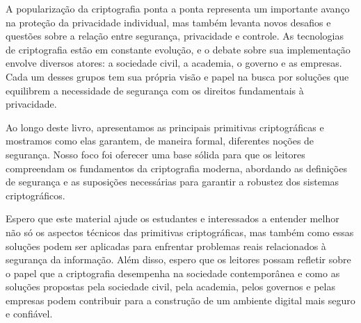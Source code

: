 A popularização da criptografia ponta a ponta representa um importante avanço na proteção da privacidade individual, mas também levanta novos desafios e questões sobre a relação entre segurança, privacidade e controle.
As tecnologias de criptografia estão em constante evolução, e o debate sobre sua implementação envolve diversos atores: a sociedade civil, a academia, o governo e as empresas.
Cada um desses grupos tem sua própria visão e papel na busca por soluções que equilibrem a necessidade de segurança com os direitos fundamentais à privacidade.

Ao longo deste livro, apresentamos as principais primitivas criptográficas e mostramos como elas garantem, de maneira formal, diferentes noções de segurança.
Nosso foco foi oferecer uma base sólida para que os leitores compreendam os fundamentos da criptografia moderna, abordando as definições de segurança e as suposições necessárias para garantir a robustez dos sistemas criptográficos.

Espero que este material ajude os estudantes e interessados a entender melhor não só os aspectos técnicos das primitivas criptográficas, mas também como essas soluções podem ser aplicadas para enfrentar problemas reais relacionados à segurança da informação.
Além disso, espero que os leitores possam refletir sobre o papel que a criptografia desempenha na sociedade contemporânea e como as soluções propostas pela sociedade civil, pela academia, pelos governos e pelas empresas podem contribuir para a construção de um ambiente digital mais seguro e confiável.



